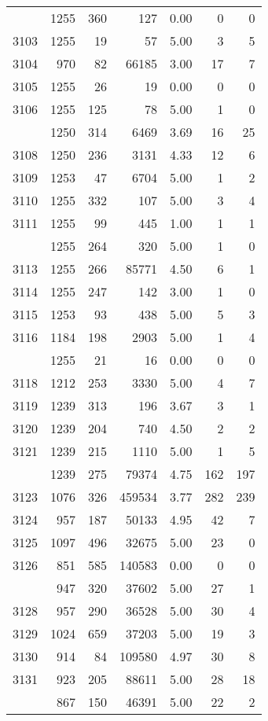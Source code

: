 \documentclass[
]{article}
\begin{document}
\begin{table}
\begin{tabular}[t]{lrrrrrr}
\addlinespace
3102 & 1255 & 360 & 127 & 0.00 & 0 & 0\\
3103 & 1255 & 19 & 57 & 5.00 & 3 & 5\\
3104 & 970 & 82 & 66185 & 3.00 & 17 & 7\\
3105 & 1255 & 26 & 19 & 0.00 & 0 & 0\\
3106 & 1255 & 125 & 78 & 5.00 & 1 & 0\\
\addlinespace
3107 & 1250 & 314 & 6469 & 3.69 & 16 & 25\\
3108 & 1250 & 236 & 3131 & 4.33 & 12 & 6\\
3109 & 1253 & 47 & 6704 & 5.00 & 1 & 2\\
3110 & 1255 & 332 & 107 & 5.00 & 3 & 4\\
3111 & 1255 & 99 & 445 & 1.00 & 1 & 1\\
\addlinespace
3112 & 1255 & 264 & 320 & 5.00 & 1 & 0\\
3113 & 1255 & 266 & 85771 & 4.50 & 6 & 1\\
3114 & 1255 & 247 & 142 & 3.00 & 1 & 0\\
3115 & 1253 & 93 & 438 & 5.00 & 5 & 3\\
3116 & 1184 & 198 & 2903 & 5.00 & 1 & 4\\
\addlinespace
3117 & 1255 & 21 & 16 & 0.00 & 0 & 0\\
3118 & 1212 & 253 & 3330 & 5.00 & 4 & 7\\
3119 & 1239 & 313 & 196 & 3.67 & 3 & 1\\
3120 & 1239 & 204 & 740 & 4.50 & 2 & 2\\
3121 & 1239 & 215 & 1110 & 5.00 & 1 & 5\\
\addlinespace
3122 & 1239 & 275 & 79374 & 4.75 & 162 & 197\\
3123 & 1076 & 326 & 459534 & 3.77 & 282 & 239\\
3124 & 957 & 187 & 50133 & 4.95 & 42 & 7\\
3125 & 1097 & 496 & 32675 & 5.00 & 23 & 0\\
3126 & 851 & 585 & 140583 & 0.00 & 0 & 0\\
\addlinespace
3127 & 947 & 320 & 37602 & 5.00 & 27 & 1\\
3128 & 957 & 290 & 36528 & 5.00 & 30 & 4\\
3129 & 1024 & 659 & 37203 & 5.00 & 19 & 3\\
3130 & 914 & 84 & 109580 & 4.97 & 30 & 8\\
3131 & 923 & 205 & 88611 & 5.00 & 28 & 18\\
\addlinespace
3132 & 867 & 150 & 46391 & 5.00 & 22 & 2\\

\end{tabular}
\end{table}
\end{document}
